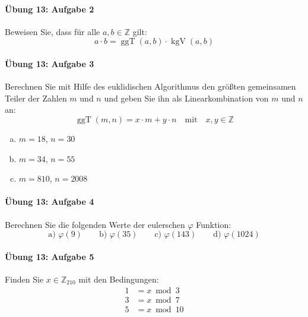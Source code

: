 \documentclass
[
  draft    = true,
  fontsize = 11pt,
  parskip  = half-,
  BCOR     = 0pt,
  DIV      = 11,
  ngerman,
  dvipsnames
]
{scrartcl}
\begin{document}
\paragraph{Übung 13: Aufgabe 2}
Beweisen Sie, dass für alle $a,b\in\mathbb{Z}$ gilt:
\begin{equation*}
  a\cdot b=\operatorname{ggT}(a,b)\cdot\operatorname{kgV}(a,b)
\end{equation*}

\paragraph{Übung 13: Aufgabe 3}
Berechnen Sie mit Hilfe des euklidischen Algorithmus den größten
gemeinsamen Teiler der Zahlen $m$ und $n$ und geben Sie
ihn als Linearkombination von $m$ und $n$ an:
\begin{equation*}
  \operatorname{ggT}(m,n)=x\cdot m+y\cdot n\quad\text{mit}\quad x,y\in\mathbb{Z}
\end{equation*}
\begin{enumerate}[a)]
  \item $m=18$, $n=30$
  \item $m=34$, $n=55$
  \item $m=810$, $n=2008$
\end{enumerate}

\paragraph{Übung 13: Aufgabe 4}
Berechnen Sie die folgenden Werte der eulerschen $\varphi$ Funktion:
\begin{equation*}
  \text{a) }\varphi(9)
  \qquad
  \text{b) }\varphi(35)
  \qquad
  \text{c) }\varphi(143)
  \qquad
  \text{d) }\varphi(1024)
\end{equation*}

\paragraph{Übung 13: Aufgabe 5}
Finden Sie $x\in\mathbb{Z}_{210}$ mit den Bedingungen:
\begin{equation*}
  \begin{split}
    1&=x\bmod3\\
    3&=x\bmod7\\
    5&=x\bmod10
  \end{split}
\end{equation*}
\end{document}
